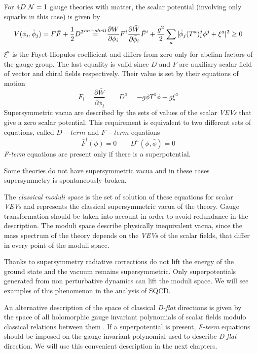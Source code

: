 For $4D \; \mathcal{N}=1$ gauge theories with matter, the scalar potential (involving only squarks in this case) is given by
\begin{equation}
 V ( \phi_i, \bar{\phi}_j) = F \bar{F} + \frac{1}{2} D^2  \quad \overset{\mathclap{on-shell}}=   \quad \frac{\partial W}{\partial \phi_i} F^i \frac{\partial \bar{W}} {\partial \bar{\phi}_i} \bar{F}^i + \frac{g^2}{2} \sum_a | \bar{\phi}_j (T^a)^j_i \phi^j + \xi^a | ^2  \geq 0
\end{equation} 
$\xi^a$ is the Fayet-Iliopulos coefficient and differs from zero only for abelian factors of the gauge group.
The last equality is valid since $D$ and $F$ are auxiliary scalar field of vector and chiral fields respectively.
Their value is set by their equations of motion
\begin{equation}
 \bar{F}_i  = \frac{\partial \bar{W}} {\partial \bar{\phi}_i} \qquad D^a = - g \bar{\phi} T^a \phi - g \xi^a 
\end{equation}
Supersymmetric vacua are described by the sets of values of the scalar \emph{VEVs} that give a zero scalar potential. 
This requirement is equivalent to two different sets of equations, called $D-term$ and $F-term $ equations
\begin{equation}
\bar{F}^i ( \phi) = 0 \qquad D^a (\phi , \bar{\phi}) = 0
\end{equation}
\emph{F-term} equations are present only if there is a superpotential.

Some theories do not have supersymmetric vacua and in these cases supersymmetry is spontaneously broken. 

The \emph{classical moduli space} is the set of solution of these equations for scalar \emph{VEVs} and represents the classical supersymmetric vacua of the theory. 
Gauge transformation should be taken into account in order to avoid redundance in the description.
The moduli space describe physically inequivalent vacua, since the mass spectrum of the theory depends on the \emph{VEVs} of the scalar fields, that differ in every point of the moduli space. 

Thanks to supersymmetry radiative corrections do not lift the energy of the ground state and the vacuum remains supersymmetric.
Only superpotentials generated from non perturbative dynamics can lift the moduli space. 
We will see examples of this phenomenon in the analysis of SQCD.

An alternative description of the space of classical \emph{D-flat} directions is given by the space of all holomorphic gauge invariant polynomials of scalar fields modulo classical relations between them \cite{Luty:1995sd}. 
If a superpotential is present, \emph{F-term} equations should be imposed on the gauge invariant polynomial used to describe \emph{D-flat} direction.
We will use this convenient description in the next chapters.




